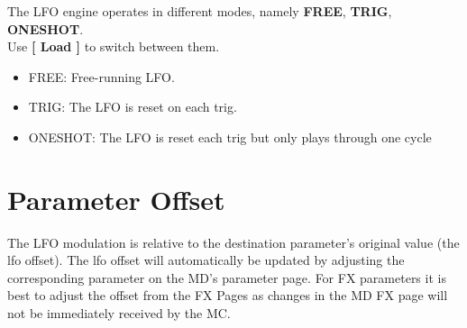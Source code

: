The LFO engine operates in different modes, namely \textbf{FREE}, \textbf{TRIG}, \textbf{ONESHOT}.\\Use \textbf{[ Load ]} to switch between them.
\begin{itemize}
    \item FREE: Free-running LFO.
    \item TRIG: The LFO is reset on each trig.
    \item ONESHOT: The LFO is reset each trig but only plays through one cycle
\end{itemize}
\section{Parameter Offset}
The LFO modulation is relative to the destination parameter's original value (the lfo offset). The lfo offset will automatically be updated by adjusting the corresponding parameter on the MD's parameter page. For FX parameters it is best to adjust the offset from the FX Pages as changes in the MD FX page will not be immediately received by the MC.
